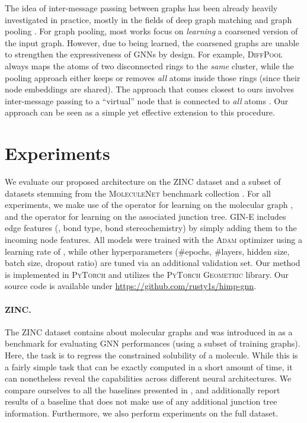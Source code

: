 \documentclass{article}
\begin{document}
The idea of inter-message passing between graphs has been already heavily investigated in practice, mostly in the fields of deep graph matching \citep{Wang/etal/2018,Li/etal/2019,Fey/etal/2020} and graph pooling \citep{Ying/etal/2018,Gao/Ji/2019}.
For graph pooling, most works focus on \emph{learning} a coarsened version of the input graph.
However, due to being learned, the coarsened graphs are unable to strengthen the expressiveness of GNNs by design.
For example, \textsc{DiffPool} \citep{Ying/etal/2018} always maps the atoms of two disconnected rings to the \emph{same} cluster, while the  pooling approach \citep{Gao/Ji/2019} either keeps or removes \emph{all} atoms inside those rings (since their node embeddings are shared).
The approach that comes closest to ours involves inter-message passing to a ``virtual'' node that is connected to \emph{all} atoms \citep{Gilmer/etal/2017,Hu/etal/2020b}.
Our approach can be seen as a simple yet effective extension to this procedure.

\section{Experiments}\label{sec:experiments}

We evaluate our proposed architecture on the \textsc{ZINC} dataset \citep{Kusner/etal/2017} and a subset of datasets stemming from the \textsc{MoleculeNet} benchmark collection \citep{Wu/etal/2018}.
For all experiments, we make use of the  operator for learning on the molecular graph \citep{Hu/etal/2020a}, and the  operator \citep{Xu/etal/2019} for learning on the associated junction tree.
\textsc{GIN-E} includes edge features (\eg, bond type, bond stereochemistry) by simply adding them to the incoming node features.
All models were trained with the \textsc{Adam} optimizer \citep{Kingma/Ba/2015} using a learning rate of , while other hyperparameters (\#epochs, \#layers, hidden size, batch size, dropout ratio) are tuned via an additional validation set.
Our method is implemented in \textsc{PyTorch} \citep{Paszke/etal/2019} and utilizes the \textsc{PyTorch Geometric} \citep{Fey/Lenssen/2019} library.
Our source code is available under \url{https://github.com/rusty1s/himp-gnn}.

\paragraph{ZINC.}\label{par:zinc.}

The \textsc{ZINC} dataset \citep{Kusner/etal/2017} contains about  molecular graphs and was introduced in \citet{Dwivedi/etal/2020} as a benchmark for evaluating GNN performances (using a subset of  training graphs).
Here, the task is to regress the constrained solubility of a molecule.
While this is a fairly simple task that can be exactly computed in a short amount of time, it can nonetheless reveal the capabilities across different neural architectures.
We compare ourselves to all the baselines presented in \citet{Dwivedi/etal/2020}, and additionally report results of a  baseline that does not make use of any additional junction tree information.
Furthermore, we also perform experiments on the full dataset.
\end{document}
